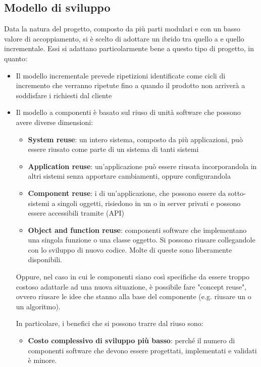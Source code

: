 	\subsection{Modello di sviluppo} %
	Data la natura del progetto, composto da più parti modulari e con un basso valore di accoppiamento, si è scelto di adottare un  ibrido tra quello a  e quello incrementale.
	Essi si adattano particolarmente bene a questo tipo di progetto, in quanto:
	\begin{itemize}
		\item Il modello incrementale prevede ripetizioni identificate come cicli di incremento che verranno ripetute fino a quando il prodotto non arriverà a soddisfare i  richiesti dal cliente
		\item Il modello a componenti è basato sul riuso di unità software che possono avere diverse dimensioni:
		\begin{itemize}
			\item \textbf{System reuse}: un intero sistema, composto da più applicazioni, può essere riusato come parte di un sistema di tanti sistemi %
			\item \textbf{Application reuse}: un'applicazione può essere riusata incorporandola in altri sistemi senza apportare cambiamenti, 
				oppure configurandola
			\item \textbf{Component reuse}: i  di un'applicazione, che possono essere da sotto-sistemi a singoli oggetti, risiedono
				in un  o in server privati e possono essere accessibili tramite  (API)
			\item \textbf{Object and function reuse}: componenti software che implementano una singola funzione o una classe oggetto. Si 
				possono riusare collegandole con lo sviluppo di nuovo codice. Molte di queste sono liberamente disponibili. 
		\end{itemize}
		Oppure, nel caso in cui le componenti siano così specifiche da essere troppo costoso adattarle ad una nuova situazione,
		è possibile fare "concept reuse", ovvero riusare le idee che stanno alla base del componente (e.g. riusare un  o un algoritmo). \par
		In particolare, i benefici che si possono trarre dal riuso sono:
		\begin{itemize}
			\item \textbf{Costo complessivo di sviluppo più basso}: perché il numero di componenti software che devono essere progettati, implementati e validati è minore.

\end{itemize}
\end{itemize}
